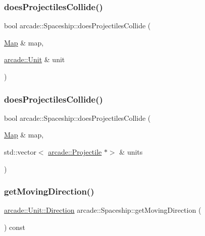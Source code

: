 \subsubsection{\texorpdfstring{does\+Projectiles\+Collide()}{doesProjectilesCollide()}\hspace{0.1cm}{\footnotesize\ttfamily [1/2]}}
{\footnotesize\ttfamily bool arcade\+::\+Spaceship\+::does\+Projectiles\+Collide (\begin{DoxyParamCaption}\item[{\hyperlink{classarcade_1_1_map}{Map} \&}]{map,  }\item[{\hyperlink{classarcade_1_1_unit}{arcade\+::\+Unit} \&}]{unit }\end{DoxyParamCaption})\hspace{0.3cm}{\ttfamily [virtual]}}

\mbox{\label{classarcade_1_1_spaceship_af23a861c85c36e432e195ab3cd239058}} 
\subsubsection{\texorpdfstring{does\+Projectiles\+Collide()}{doesProjectilesCollide()}\hspace{0.1cm}{\footnotesize\ttfamily [2/2]}}
{\footnotesize\ttfamily bool arcade\+::\+Spaceship\+::does\+Projectiles\+Collide (\begin{DoxyParamCaption}\item[{\hyperlink{classarcade_1_1_map}{Map} \&}]{map,  }\item[{std\+::vector$<$ \hyperlink{classarcade_1_1_projectile}{arcade\+::\+Projectile} $\ast$$>$ \&}]{units }\end{DoxyParamCaption})}

\mbox{\label{classarcade_1_1_spaceship_a3c768c9647ac59db68f278c1c9cb9f03}} 
\subsubsection{\texorpdfstring{get\+Moving\+Direction()}{getMovingDirection()}}
{\footnotesize\ttfamily \hyperlink{classarcade_1_1_unit_af418afeaba1f7fd5934b6ae1343215dd}{arcade\+::\+Unit\+::\+Direction} arcade\+::\+Spaceship\+::get\+Moving\+Direction (\begin{DoxyParamCaption}{ }\end{DoxyParamCaption}) const}

